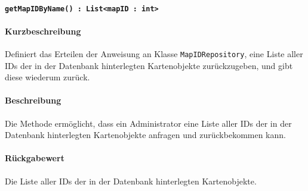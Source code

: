 \paragraph{\texttt{getMapIDByName() : List<mapID : int>}}%
\paragraph*{Kurzbeschreibung}
Definiert das Erteilen der Anweisung an Klasse \texttt{MapIDRepository}, eine Liste aller IDs der in der Datenbank hinterlegten Kartenobjekte zurückzugeben, und gibt diese wiederum zurück.
\paragraph*{Beschreibung}
Die Methode ermöglicht, dass ein Administrator eine Liste aller IDs der in der Datenbank hinterlegten Kartenobjekte anfragen und zurückbekommen kann.
\paragraph*{Rückgabewert}
Die Liste aller IDs der in der Datenbank hinterlegten Kartenobjekte.
